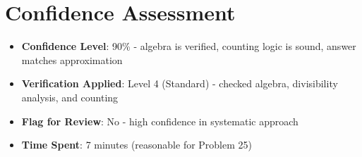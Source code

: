\documentclass[]{article}
\begin{document}
	\section*{Confidence Assessment}
	\begin{itemize}[leftmargin=*]
		\item \textbf{Confidence Level}: 90\% - algebra is verified, counting logic is sound, answer matches approximation
		\item \textbf{Verification Applied}: Level 4 (Standard) - checked algebra, divisibility analysis, and counting
		\item \textbf{Flag for Review}: No - high confidence in systematic approach
		\item \textbf{Time Spent}: 7 minutes (reasonable for Problem 25)
	\end{itemize}
	
\end{document}
